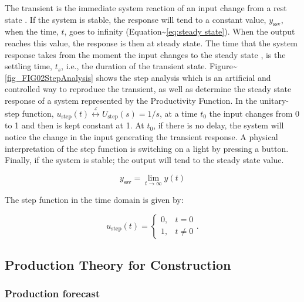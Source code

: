 \documentclass{article}
\begin{document}
The transient is the immediate system reaction of an input change from a rest state \citep{Ogata2010}.
If the system is stable, the response will tend to a constant value, \(y_{\mbox{ssv}}\), when the time, \(t\), goes to infinity (Equation\textasciitilde{}\ref{eq:steady state}).
When the output reaches this value, the response is then at steady state.
The time that the system response takes from the moment the input changes to the steady state \citep{Nise2010,Ogata2010}, is the settling time, \(t_s\), i.e., the duration of the transient state.
Figure\textasciitilde{}\ref{fig_FIG02StepAnalysis} shows the step analysis which is an artificial and controlled way to reproduce the transient, as well as determine the steady state response of a system represented by the Productivity Function.
In the unitary-step function, \(u_{\mbox{step}}(t) \overset{\underset{\mathrm{\mathcal{L}}}{}}{\leftrightarrow} U_{\mbox{step}}(s) = 1/s\), at a time \(t_0\) the input changes from 0 to 1 and then is kept constant at 1.
At \(t_0\), if there is no delay, the system will notice the change in the input generating the transient response.
A physical interpretation of the step function is switching on a light by pressing a button.
Finally, if the system is stable; the output will tend to the steady state value.

\begin{equation}\label{eq:steady state}
	y_{\mbox{ssv}} = \lim_{t\rightarrow \infty} y(t)
\end{equation}

The step function in the time domain is given by:

\begin{equation}\label{eq:Step function in time domain P7}
	u_{\mbox{step}}(t) =
	\begin{cases}
 	0, & t = 0 \\
  	1, & t \ne 0
	\end{cases}.
\end{equation}

\subsection{Production Theory for Construction}
\label{sec:org5ff6838}
\subsubsection{Production forecast}
\label{sec:org7cf6ca6}
\end{document}
